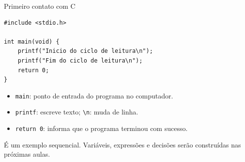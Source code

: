 \begin{frame}[fragile,t]{Primeiro contato com C}
\begin{lstlisting}
#include <stdio.h>

int main(void) {
    printf("Inicio do ciclo de leitura\n");
    printf("Fim do ciclo de leitura\n");
    return 0;
}
\end{lstlisting}
\begin{itemize}
\item \texttt{main}: ponto de entrada do programa no computador.
\item \texttt{printf}: escreve texto; \texttt{\textbackslash n}: muda de linha.
\item \texttt{return 0}: informa que o programa terminou com sucesso.
\end{itemize}
\small É um exemplo sequencial. Variáveis, expressões e decisões serão construídas nas próximas aulas.
\end{frame}

